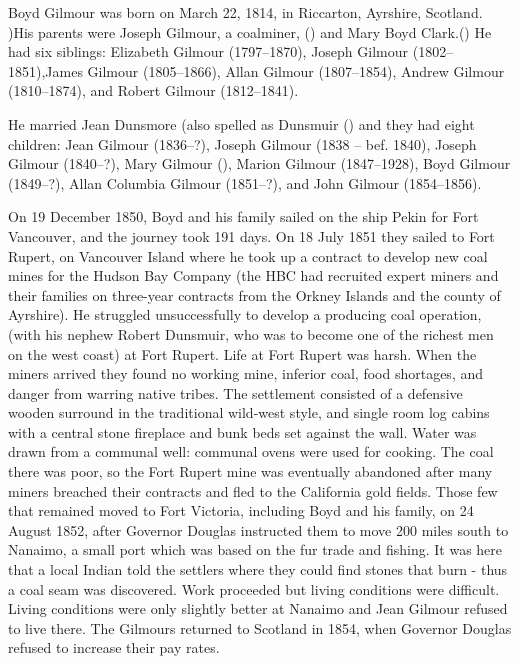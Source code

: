 
Boyd Gilmour was born on March 22, 1814, in Riccarton, Ayrshire, Scotland. \cite{BGbirth})His parents were Joseph Gilmour, a coalminer, () and Mary Boyd Clark.() He had six siblings: Elizabeth Gilmour (1797--1870), Joseph Gilmour (1802--1851),James Gilmour (1805--1866), Allan Gilmour (1807--1854), Andrew Gilmour (1810--1874), and Robert Gilmour (1812--1841).

He married Jean Dunsmore (also spelled as Dunsmuir () and they had eight children:  Jean Gilmour (1836--?), Joseph Gilmour (1838 -- bef. 1840), Joseph Gilmour (1840--?), Mary Gilmour (), Marion Gilmour (1847--1928), Boyd Gilmour (1849--?), Allan Columbia Gilmour (1851--?), and John Gilmour (1854--1856).

On 19 December 1850, Boyd and his family sailed on the ship Pekin for Fort Vancouver, and the journey took 191 days. On 18 July 1851 they sailed to Fort Rupert, on Vancouver Island where he took up a contract to develop new coal mines for the Hudson Bay Company (the HBC had recruited expert miners and their families on three-year contracts from the Orkney Islands and the county of Ayrshire). He struggled unsuccessfully to develop a producing coal operation, (with his nephew Robert Dunsmuir, who was to become one of the richest men on the west coast) at Fort Rupert. Life at Fort Rupert was harsh. When the miners arrived they found no working mine, inferior coal, food shortages, and danger from warring native tribes. The settlement consisted of a defensive wooden surround in the traditional wild-west style, and single room log cabins with a central stone fireplace and bunk beds set against the wall. Water was drawn from a communal well: communal ovens were used for cooking. The coal there was poor, so the Fort Rupert mine was eventually abandoned after many miners breached their contracts and fled to the California gold fields. Those few that remained moved to Fort Victoria, including Boyd and his family, on 24 August 1852, after Governor Douglas instructed them to move 200 miles south to Nanaimo, a small port which was based on the fur trade and fishing. It was here that a local Indian told the settlers where they could find stones that burn - thus a coal seam was discovered. Work proceeded but living conditions were difficult. Living conditions were only slightly better at Nanaimo and Jean Gilmour refused to live there. The Gilmours returned to Scotland in 1854, when Governor Douglas refused to increase their pay rates. \cite{BGilmourCanada}

